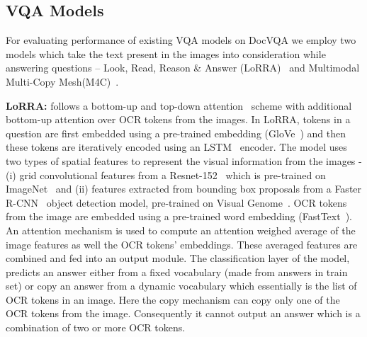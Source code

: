 \documentclass[10pt,twocolumn,letterpaper]{article}
\newcommand{\datasetName}{DocVQA\xspace}
\newcommand{\lorra}{LoRRA\xspace}
\newcommand{\mc}{M4C\xspace}
\begin{document}
\subsection{VQA Models}
\label{sec: vqa models}
For evaluating performance of existing VQA models on \datasetName we employ two models which take the text present in the images into consideration while answering questions -- Look, Read, Reason \& Answer (\lorra)~\cite{textvqa} and Multimodal Multi-Copy Mesh(\mc)~\cite{m4c}.

\textbf{\lorra:} follows a bottom-up and top-down attention~\cite{topdown_bottomup} scheme with additional bottom-up attention over OCR tokens from the images.
In \lorra, tokens in a question are first embedded using a pre-trained embedding (GloVe~\cite{glove}) and then these tokens are iteratively encoded using an LSTM~\cite{lstm} encoder. The model uses two types of spatial features to represent the visual  information from the images - (i) grid convolutional features from a  Resnet-152~\cite{resnet} which is pre-trained on ImageNet~\cite{imagenet} and (ii) features extracted from  bounding box proposals from a Faster R-CNN~\cite{faster-r-cnn} object detection model, pre-trained on Visual Genome~\cite{visual_genome}. OCR tokens from the image are embedded using a pre-trained word embedding (FastText~\cite{fasttext}). An attention mechanism is used to compute an attention weighed average of the image features as well the OCR tokens' embeddings. These averaged features are combined and fed into an output module. The classification layer of the model, predicts an answer either from a fixed vocabulary (made from answers in train set) or copy an answer from a dynamic vocabulary which essentially is the list of OCR tokens in an image. Here the copy mechanism can copy only one of the OCR tokens from the image. Consequently it cannot output an answer which is a combination of two or more OCR tokens.
\end{document}
